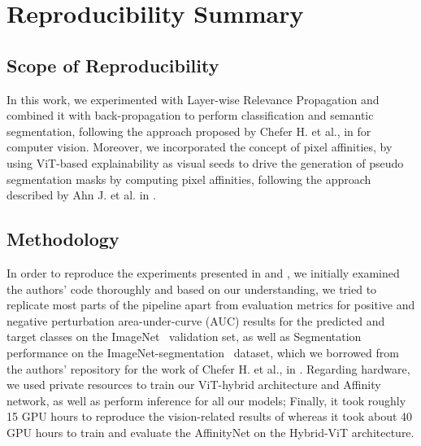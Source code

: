 \section{Reproducibility Summary}

\subsection{Scope of Reproducibility}
In this work\cite{Sinha:2021}, we experimented with Layer-wise Relevance Propagation and combined it with back-propagation to perform classification and semantic segmentation, following the approach proposed by Chefer H. et al., in \cite{mainpaper} for computer vision. Moreover, we incorporated the concept of pixel affinities, by using ViT-based explainability as visual seeds to drive the generation of pseudo segmentation masks by computing pixel affinities, following the approach described by Ahn J. et al. in \cite{ahn2018learning}.

\subsection{Methodology}
In order to reproduce the experiments presented in \cite{mainpaper} and \cite{ahn2018learning}, we initially examined the authors' code thoroughly and based on our understanding, we tried to replicate most parts of the pipeline apart from evaluation metrics for positive and negative perturbation area-under-curve (AUC) results for the predicted and target classes on the ImageNet~\cite{russakovsky2015ImageNet} validation set, as well as Segmentation performance on the ImageNet-segmentation~\cite{imagenet-seg} dataset, which we borrowed from the authors' repository for the work of Chefer H. et al., in \cite{mainpaper}. Regarding hardware, we used private resources to train our ViT-hybrid architecture and Affinity network, as well as perform inference for all our models; Finally, it took roughly 15 GPU hours to reproduce the vision-related results of \cite{mainpaper} whereas it took about 40 GPU hours to train and evaluate the AffinityNet on the Hybrid-ViT architecture.

